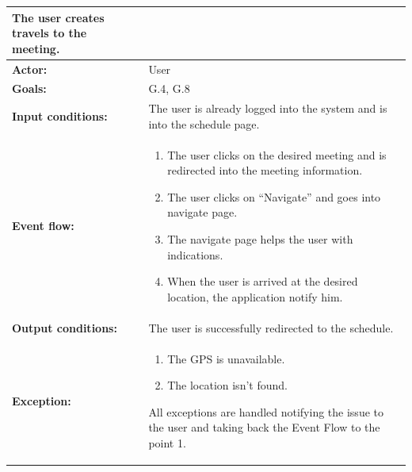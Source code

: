 \begin{tabular} { p{5cm} p{8cm} }  
\textbf{The user creates travels to the meeting.}\\
\hline
\textbf{Actor:} & User \\ 
\textbf{Goals:} & G.4, G.8 \\ 
\textbf{Input conditions:} & The user is already logged into the system and is into the schedule page. \\
\textbf{Event flow:} & \begin{enumerate}
				\item
				The user clicks on the desired meeting and is redirected into the meeting information.
				\item
				The user clicks on “Navigate” and goes into navigate page.
				\item
				The navigate page helps the user with indications.
				\item
				When the user is arrived at the desired location, the application notify him.
			\end{enumerate} \\ 
\textbf{Output conditions:} & The user is successfully redirected to the
schedule.\\ 
\textbf{Exception:} & \begin{enumerate}
				\item
				The GPS is unavailable.
				\item
				The location isn’t found. 
			\end{enumerate}
All exceptions are handled notifying the issue to the user and taking back the Event Flow to the point 1. \\
\hline
\end{tabular}


